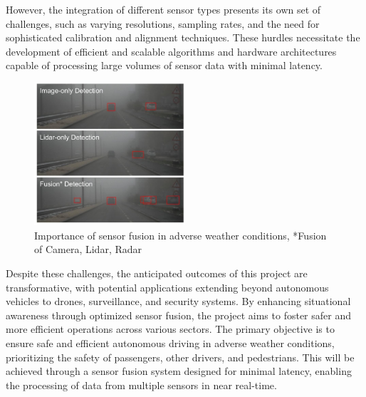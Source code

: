 \documentclass[report.tex]{subfiles}
\begin{document}
        However, the integration of different sensor types presents its own set of challenges, such as varying resolutions, sampling rates, and the need for sophisticated calibration and alignment techniques. These hurdles necessitate the development of efficient and scalable algorithms and hardware architectures capable of processing large volumes of sensor data with minimal latency.

        \begin{figure}[h]
            \centering
            \includegraphics[width=0.5\textwidth]{images/introduction/fusion_in_adverse_weather.png}
            \caption{Importance of sensor fusion in adverse weather conditions, *Fusion of Camera, Lidar, Radar \cite{bijelic2020seeing}}
            \label{fig:sensors_intro_3}
        \end{figure}

        Despite these challenges, the anticipated outcomes of this project are transformative, with potential applications extending beyond autonomous vehicles to drones, surveillance, and security systems. By enhancing situational awareness through optimized sensor fusion, the project aims to foster safer and more efficient operations across various sectors. The primary objective is to ensure safe and efficient autonomous driving in adverse weather conditions, prioritizing the safety of passengers, other drivers, and pedestrians. This will be achieved through a sensor fusion system designed for minimal latency, enabling the processing of data from multiple sensors in near real-time.

\end{document}
